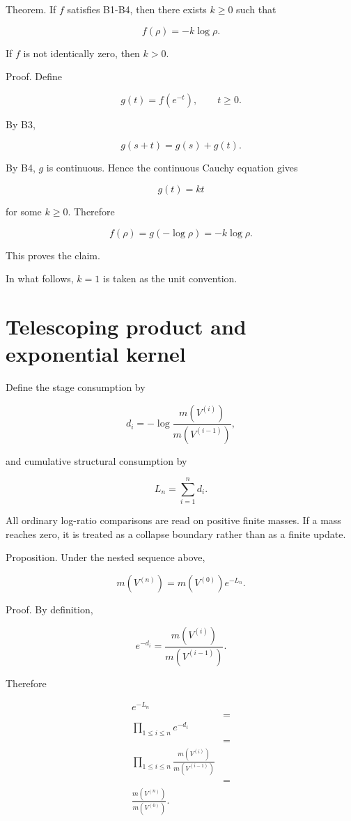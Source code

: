 \documentclass[12pt,a4paper]{article}
\begin{document}
Theorem. If \(f\) satisfies B1-B4, then there exists \(k\ge0\) such that

\[
f(\rho)=-k\log \rho.
\]

If \(f\) is not identically zero, then \(k>0\).

Proof. Define

\[
g(t)=f(e^{-t}), \qquad t\ge0.
\]

By B3,

\[
g(s+t)=g(s)+g(t).
\]

By B4, \(g\) is continuous. Hence the continuous Cauchy equation gives

\[
g(t)=kt
\]

for some \(k\ge0\). Therefore

\[
f(\rho)=g(-\log \rho)=-k\log \rho.
\]

This proves the claim.

In what follows, \(k=1\) is taken as the unit convention.

\section{Telescoping product and exponential kernel}\label{telescoping-product-and-exponential-kernel}

Define the stage consumption by

\[
d_{i}=-\log\frac{m(V^{(i)})}{m(V^{(i-1)})},
\]

and cumulative structural consumption by

\[
L_{n}=\sum_{i=1}^{n}d_{i}.
\]

All ordinary log-ratio comparisons are read on positive finite masses. If a mass reaches zero, it is treated as a collapse boundary rather than as a finite update.

Proposition. Under the nested sequence above,

\[
m(V^{(n)})=m(V^{(0)})e^{-L_{n}}.
\]

Proof. By definition,

\[
e^{-d_{i}}=\frac{m(V^{(i)})}{m(V^{(i-1)})}.
\]

Therefore

\[
\begin{aligned}
e^{-L_{n}} \\
&= \\
\prod_{1\le i\le n} e^{-d_{i}} \\
&= \\
\prod_{1\le i\le n}\frac{m(V^{(i)})}{m(V^{(i-1)})} \\
&= \\
\frac{m(V^{(n)})}{m(V^{(0)})}.
\end{aligned}
\]
\end{document}

